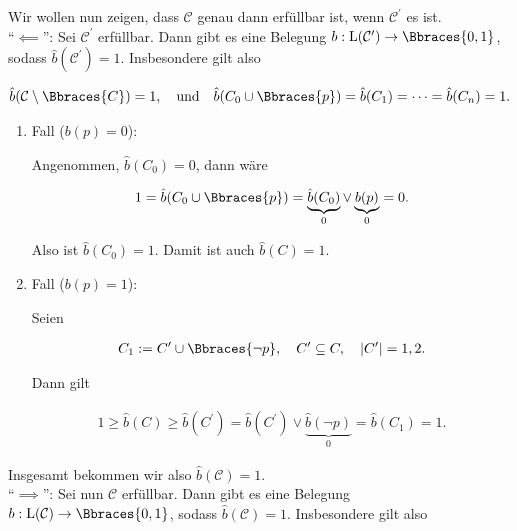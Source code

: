 \begin{solution}
Wir wollen nun zeigen, dass $\mathcal C$ genau dann erfüllbar ist, wenn $\mathcal C^\prime$ es ist. \\

\enquote{$\impliedby$}:
Sei $\mathcal C^\prime$ erfüllbar.
Dann gibt es eine Belegung $b: \operatorname L(\mathcal C^\prime) \to \Bbraces{0, 1}$, sodass $\hat b(\mathcal C^\prime) = 1$.
Insbesondere gilt also

\begin{align*}
    \hat b(\mathcal C \setminus \Bbraces{C}) = 1,
    \quad
    \text{und}
    \quad
    \hat b(C_0 \cup \Bbraces{p}) = \hat b(C_1) = \dots = \hat b(C_n) = 1.
\end{align*}

\begin{enumerate}[label = \arabic*.]

    \item Fall ($b(p) = 0$):
    
    Angenommen, $\hat b(C_0) = 0$, dann wäre

    \begin{align*}
        1
        =
        \hat b(C_0 \cup \Bbraces{p})
        =
        \underbrace{\hat b(C_0)}_0
        \lor
        \underbrace{b(p)}_0
        =
        0.
    \end{align*}

    Also ist $\hat b(C_0) = 1$.
    Damit ist auch $\hat b(C) = 1$.

    \item Fall ($b(p) = 1$):
    
    Seien

    \begin{align*}
        C_1 := C^\prime \cup \Bbraces{\neg p},
        \quad
        C^\prime \subseteq C,
        \quad
        |C^\prime| = 1, 2.
    \end{align*}

    Dann gilt

    \begin{align*}
        1
        \geq
        \hat b(C)
        \geq
        \hat b(C^\prime)
        =
        \hat b(C^\prime)
        \lor \underbrace{\hat b(\neg p)}_0
        =
        \hat b(C_1)
        =
        1.
    \end{align*}

\end{enumerate}

Insgesamt bekommen wir also $\hat b(\mathcal C) = 1$. \\

\enquote{$\implies$}:
Sei nun $\mathcal C$ erfüllbar.
Dann gibt es eine Belegung $b: \operatorname L(\mathcal C) \to \Bbraces{0, 1}$, sodass $\hat b(\mathcal C) = 1$.
Insbesondere gilt also


\end{solution}
